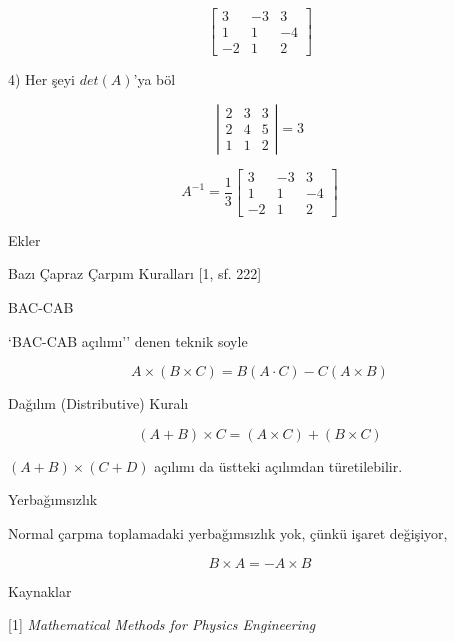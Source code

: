 \documentclass[12pt,fleqn]{article}\usepackage{../../common}
\begin{document}
$$
\left[\begin{array}{rrr}
3 & -3 & 3 \\
1 & 1 & -4 \\
-2 & 1 & 2
\end{array}\right]
$$

4) Her şeyi $det(A)$'ya böl

$$
\left|\begin{array}{rrr}
2 & 3 & 3 \\
2 & 4 & 5 \\
1 & 1 & 2
\end{array}\right| = 3
$$

$$ A^{-1} =
\frac{1}{3}
\left[\begin{array}{rrr}
3 & -3 & 3 \\
1 & 1 & -4 \\
-2 & 1 & 2
\end{array}\right]
$$

Ekler

Bazı Çapraz Çarpım Kuralları [1, sf. 222]

BAC-CAB

`BAC-CAB açılımı'' denen teknik soyle 

$$
A \times (B \times C) = B(A \cdot C) - C(A \times B)
$$

Dağılım (Distributive) Kuralı

$$
(A+B) \times C = (A \times C) + (B \times C)
$$

$(A+B) \times (C+D)$ açılımı da üstteki açılımdan türetilebilir.

Yerbağımsızlık

Normal çarpma toplamadaki yerbağımsızlık yok, çünkü işaret değişiyor,

$$
B \times A = - A \times B
$$

Kaynaklar

[1] {\em Mathematical Methods for Physics Engineering}
\end{document}
